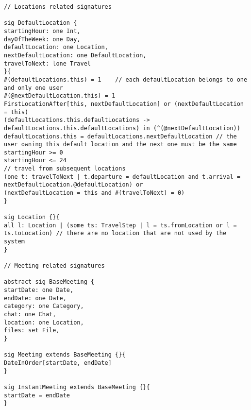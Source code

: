 \begin{lstlisting}[style=alloy]
// Locations related signatures

sig DefaultLocation {
startingHour: one Int,
dayOfTheWeek: one Day,
defaultLocation: one Location,
nextDefaultLocation: one DefaultLocation,
travelToNext: lone Travel
}{
#(defaultLocations.this) = 1	// each defaultLocation belongs to one and only one user
#(@nextDefaultLocation.this) = 1
FirstLocationAfter[this, nextDefaultLocation] or (nextDefaultLocation = this)
(defaultLocations.this.defaultLocations -> defaultLocations.this.defaultLocations) in (^(@nextDefaultLocation))
defaultLocations.this = defaultLocations.nextDefaultLocation // the user owning this default location and the next one must be the same
startingHour >= 0
startingHour <= 24
// travel from subsequent locations
(one t: travelToNext | t.departure = defaultLocation and t.arrival = nextDefaultLocation.@defaultLocation) or 
(nextDefaultLocation = this and #(travelToNext) = 0)
}

sig Location {}{
all l: Location | (some ts: TravelStep | l = ts.fromLocation or l = ts.toLocation) // there are no location that are not used by the system
}

// Meeting related signatures

abstract sig BaseMeeting {
startDate: one Date,
endDate: one Date,
category: one Category,
chat: one Chat,
location: one Location,
files: set File,
}

sig Meeting extends BaseMeeting {}{
DateInOrder[startDate, endDate]
}

sig InstantMeeting extends BaseMeeting {}{
startDate = endDate
}


\end{lstlisting}
